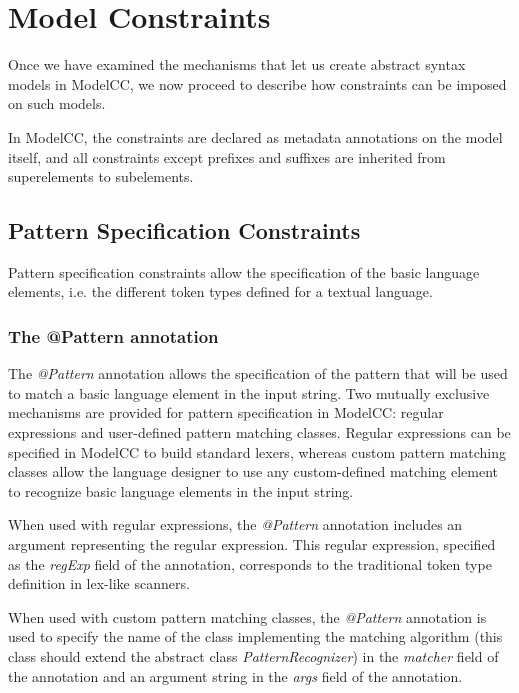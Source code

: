 \documentclass[a4paper,twoside,onecolumn]{article}
\newcommand{\an}[1]{\emph{#1}} %
\begin{document}
\section{Model Constraints} \label{sec:modelcons}

Once we have examined the mechanisms that let us create abstract syntax models in ModelCC, we now proceed to describe how constraints can be
imposed on such models.

In ModelCC, the constraints are declared as metadata annotations on the model itself, and all constraints except prefixes and suffixes are inherited from superelements to subelements.

\subsection{Pattern Specification Constraints} \label{sec:patterns}

Pattern specification constraints allow the specification of the basic language elements, i.e. the different token types
defined for a textual language.

\subsubsection{The @Pattern annotation}

The \an{@Pattern} annotation allows the specification of the pattern that will be used to match a basic language element in the input string.
Two mutually exclusive mechanisms are provided for pattern specification in ModelCC: regular expressions and user-defined pattern matching
classes. Regular expressions can be specified in ModelCC to build standard lexers, whereas custom pattern matching classes allow the language
designer to use any custom-defined matching element to recognize basic language elements in the input string.

When used with regular expressions, the \an{@Pattern} annotation includes an argument representing the regular expression. This regular
expression, specified as the \emph{regExp} field of the annotation, corresponds to the traditional token type definition in lex-like scanners.

When used with custom pattern matching classes, the \an{@Pattern} annotation is used to specify the name of the class implementing the matching
algorithm (this class should extend the abstract class \emph{PatternRecognizer}) in the \emph{matcher} field of the annotation and an argument string in the \emph{args} field of the annotation.
\end{document}
